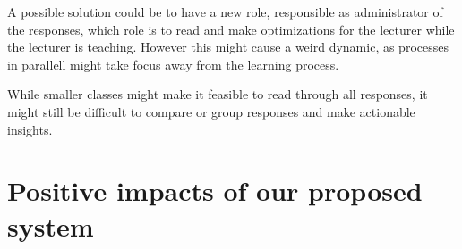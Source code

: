 A possible solution could be to have a new role, responsible as administrator of the responses, which role is to read and make optimizations for the lecturer while the lecturer is teaching. However this might cause a weird dynamic, as processes in parallell might take focus away from the learning process.

While smaller classes might make it feasible to read through all responses, it might still be difficult to compare or group responses and make actionable insights. 







\section{Positive impacts of our proposed system}

